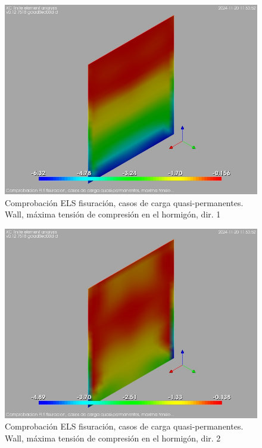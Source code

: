 \begin{figure}[ht]
\begin{center}
\includegraphics[width=\linewidth]{results/graphics/crackingSLS_qperm/wallsigma_cSect1}
\caption{Comprobación ELS fisuración, casos de carga quasi-permanentes. Wall, máxima tensión de compresión en el hormigón, dir. 1}
\label{SLS_quasiPermanentLoadsCrackControlwallsigma_cSect1}
\end{center}
\end{figure}
\begin{figure}[ht]
\begin{center}
\includegraphics[width=\linewidth]{results/graphics/crackingSLS_qperm/wallsigma_cSect2}
\caption{Comprobación ELS fisuración, casos de carga quasi-permanentes. Wall, máxima tensión de compresión en el hormigón, dir. 2}
\label{SLS_quasiPermanentLoadsCrackControlwallsigma_cSect2}
\end{center}
\end{figure}
